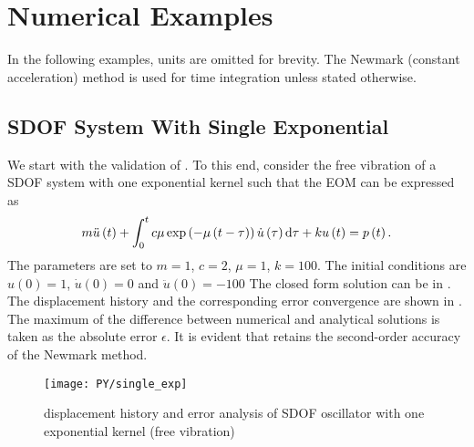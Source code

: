 \section{Numerical Examples}\label{sec:example}
In the following examples, units are omitted for brevity.
The Newmark (constant acceleration) method is used for time integration unless stated otherwise.
\subsection{SDOF System With Single Exponential}
We start with the validation of . To this end, consider the free vibration of a SDOF system with one exponential kernel such that the EOM can be expressed as
\begin{gather}
m\ddot{u}\left(t\right)+\int_0^tc\mu\exp\left(-\mu\left(t-\tau\right)\right)\dot{u}\left(\tau\right)\mathrm{d}\tau+ku\left(t\right)=p\left(t\right).
\end{gather}
The parameters are set to $m=1$, $c=2$, $\mu=1$, $k=100$.
The initial conditions are $u\left(0\right)=1$, $\dot{u}\left(0\right)=0$ and $\ddot{u}\left(0\right)=-100$ The  closed form solution can be  in .
The displacement history and the corresponding error convergence are shown in .
The maximum of the difference between numerical and analytical solutions is taken as the absolute error $\epsilon$. It is evident that  retains the second-order accuracy of the Newmark method.
\begin{figure}[H]
\centering
\texttt{[image: PY/single\_exp]}
\caption{displacement history and error analysis of SDOF oscillator with one exponential kernel (free vibration)}\label{fig:sdof}
\end{figure}


